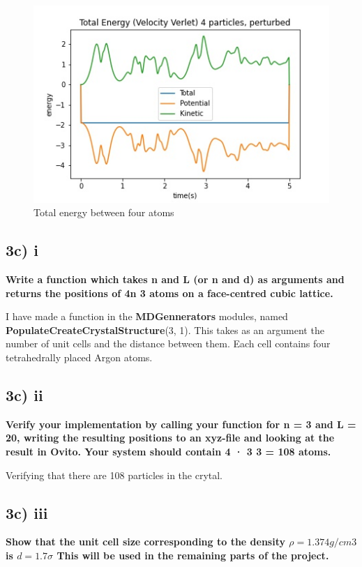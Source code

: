 \begin{figure}[h!]
        \centering 
        \includegraphics[scale=0.6]{./py/3b_v.jpg} 
        \caption{Total energy between four atoms }
        \label{fig:3biv}
\end{figure}

\subsection*{3c) i}
\textbf{Write a function which takes n and L (or n and d) as arguments and returns the positions of 4n
3
atoms on a face-centred cubic lattice.
}

I have made a function in the  \textbf{MDGennerators} modules, named \textbf{PopulateCreateCrystalStructure}(3, 1). This takes as an argument the number of unit cells and the distance between them. Each cell contains four tetrahedrally placed Argon atoms.

\subsection*{3c) ii}
\textbf{Verify your implementation by calling your function for n = 3 and L = 20, writing the resulting
positions to an xyz-file and looking at the result in Ovito. Your system should contain 4 · 3
3 = 108
atoms.}

Verifying that there are 108 particles in the crytal.

\subsection*{3c) iii}
\textbf{Show that the unit cell size corresponding to the density $\rho = 1.374 g/cm3$
is $d = 1.7\sigma$ This will be used in the remaining parts of the project.}

